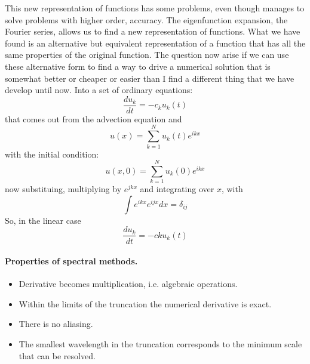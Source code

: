This new representation of functions has some problems, even though manages to solve problems with higher order, accuracy. The eigenfunction expansion, the Fourier series, allows us to find a new representation of functions. What we have found is an alternative but equivalent representation of a function that has all the same properties of the original function. The question now arise if we can use these alternative form to find a way to drive a numerical solution that is somewhat better or cheaper or easier than I find a different thing that we have develop until now. Into a set of ordinary equations:
$$ \frac{du_k}{dt}=-c_ku_k(t) $$
that comes out from the advection equation and 
\begin{equation}\label{eq.u(x)}
    u(x)=\displaystyle\sum_{k=1}^Nu_k(t)e^{ikx}
\end{equation} with the initial condition:
\begin{equation}\label{eq.u(x,0)}
    u(x,0)=\displaystyle\sum_{k=1}^Nu_k(0)e^{ikx}
\end{equation}
now substituing, multiplying by $e^{jkx}$ and integrating  over $x$, with $$\int e^{ikx}e^{ijx}dx=\delta_{ij}$$
So, in the linear case
\begin{equation}
    \frac{du_k}{dt}=-cku_k(t)
\end{equation}
\paragraph{Properties of spectral methods.}
\begin{itemize}
    \item Derivative becomes multiplication, i.e. algebraic operations.
    \item Within the limits of the truncation the numerical derivative is exact.
    \item There is no aliasing. 
    \item The smallest wavelength in the truncation corresponds to the minimum scale that can be resolved.
\end{itemize}

